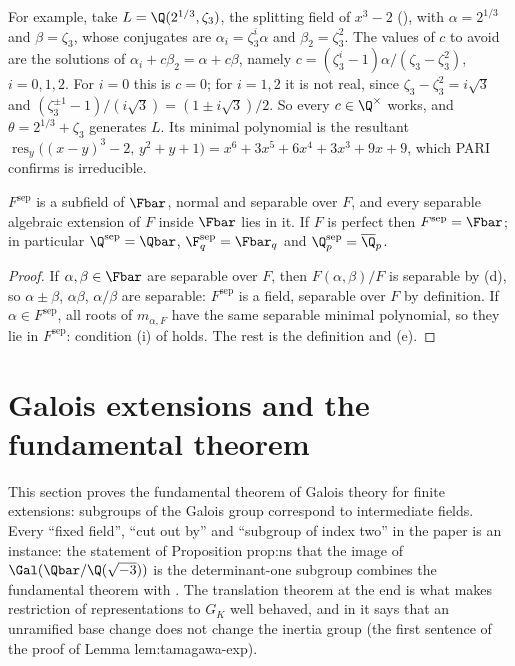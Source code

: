 For example, take $L=\Q(2^{1/3},\zeta_3)$, the splitting field of $x^3-2$ (), with $\alpha=2^{1/3}$ and $\beta=\zeta_3$, whose conjugates are
$\alpha_i=\zeta_3^{i}\alpha$ and $\beta_2=\zeta_3^2$. The values of $c$ to avoid are the solutions of $\alpha_i+c\beta_2=\alpha+c\beta$, namely
$c=(\zeta_3^i-1)\alpha/(\zeta_3-\zeta_3^2)$, $i=0,1,2$. For $i=0$ this is $c=0$; for $i=1,2$ it is not real, since $\zeta_3-\zeta_3^2=i\sqrt3$ and
$(\zeta_3^{\pm1}-1)/(i\sqrt3)=(1\pm i\sqrt3)/2$. So every $c\in\Q^\times$ works, and $\theta=2^{1/3}+\zeta_3$ generates $L$. Its minimal polynomial is the resultant
$\operatorname{res}_y\bigl((x-y)^3-2,\,y^2+y+1\bigr)=x^6+3x^5+6x^4+3x^3+9x+9$, which PARI confirms is irreducible.

\begin{proposition}\label{prop:galois:separable-closure}
$F^{\mathrm{sep}}$ is a subfield of $\Fbar$, normal and separable over $F$, and every separable algebraic extension of $F$ inside $\Fbar$ lies in it. If $F$
is perfect then $F^{\mathrm{sep}}=\Fbar$; in particular $\Q^{\mathrm{sep}}=\Qbar$, $\F_q^{\mathrm{sep}}=\Fbar_q$ and $\Q_p^{\mathrm{sep}}=\overline{\Q}_p$.
\end{proposition}

\begin{proof}
If $\alpha,\beta\in\Fbar$ are separable over $F$, then $F(\alpha,\beta)/F$ is separable by (d), so $\alpha\pm\beta$, $\alpha\beta$,
$\alpha/\beta$ are separable: $F^{\mathrm{sep}}$ is a field, separable over $F$ by definition. If $\alpha\in F^{\mathrm{sep}}$, all roots of $m_{\alpha,F}$ have the
same separable minimal polynomial, so they lie in $F^{\mathrm{sep}}$: condition (i) of  holds. The rest is the definition and
(e).
\end{proof}

\section{Galois extensions and the fundamental theorem}\label{sec:galois:fundamental}

This section proves the fundamental theorem of Galois theory for finite extensions: subgroups of the Galois group correspond to intermediate fields.
Every ``fixed field'', ``cut out by'' and ``subgroup of index two'' in the paper is an instance: the statement of Proposition prop:ns that the image
of $\Gal(\Qbar/\Q(\sqrt{-3}))$ is the determinant-one subgroup combines the fundamental theorem with . The translation
theorem at the end is what makes restriction of representations to $G_K$ well behaved, and in  it says that an unramified base change
does not change the inertia group (the first sentence of the proof of Lemma lem:tamagawa-exp).


